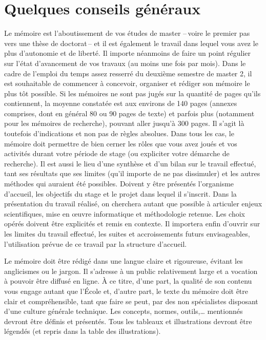 \documentclass[a4paper,12pt]{book}
\begin{document}
\section{Quelques conseils généraux}
Le mémoire est l'aboutissement de vos études de master --\,voire le premier pas vers une thèse de doctorat\,-- et il est également le travail dans lequel vous avez le plus d'autonomie et de liberté. 
Il importe néanmoins de faire un point régulier sur l'état d'avancement de vos travaux (au moins une fois par mois). Dans le cadre de l'emploi du temps assez resserré du deuxième semestre de master 2, il est souhaitable
de commencer à concevoir, organiser et rédiger son mémoire le plus tôt possible.
Si les mémoires ne sont pas jugés sur la quantité de pages qu'ils contiennent, la moyenne constatée est aux environs de 140 pages (annexes comprises, dont en général 80 ou 90 pages de texte) et parfois plus (notamment pour les mémoires de recherche), pouvant aller jusqu'à 300 pages. Il s'agit là toutefois d'indications et non pas de règles absolues.
Dans tous les cas, le mémoire doit permettre de bien cerner les rôles que vous avez joués et vos activités durant votre période de stage (ou expliciter votre démarche de recherche). 
Il est aussi le lieu d'une synthèse et d'un bilan sur le travail effectué, tant ses résultats que ses limites (qu'il importe de ne pas dissimuler) et les autres méthodes qui auraient été possibles.
Doivent y être présentés l'organisme d'accueil, les objectifs du stage et le projet dans lequel il s'inscrit. Dans la présentation du travail réalisé, on cherchera autant que possible à articuler enjeux scientifiques, mise en œuvre informatique et méthodologie retenue. 
Les choix opérés doivent être explicités et remis en contexte. 
Il importera enfin d'ouvrir sur les limites du travail effectué, les suites et accroissements futurs envisageables, l'utilisation prévue de ce travail par la structure d'accueil.

Le mémoire doit être rédigé dans une langue claire et rigoureuse, évitant les anglicismes ou le jargon. Il s'adresse à un public relativement large et a vocation à pouvoir être diffusé en ligne. À ce titre, d'une part, la qualité de son contenu vous engage autant que l'École et, d'autre part,  
le texte du mémoire doit être clair et compréhensible, tant que faire se peut, par des non spécialistes disposant d'une culture générale technique. 
Les concepts, normes, outils,\dots{} mentionnés devront être définis et présentés.
Tous les tableaux et illustrations devront être légendés (et repris dans la table des illustrations).
\end{document}
